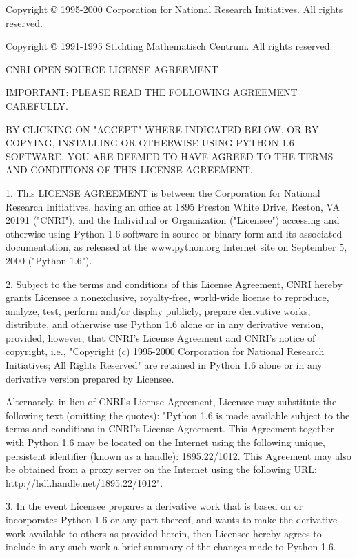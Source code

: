 Copyright \copyright{} 1995-2000 Corporation for National Research
Initiatives.  All rights reserved.

Copyright \copyright{} 1991-1995 Stichting Mathematisch Centrum.  All
rights reserved.

CNRI OPEN SOURCE LICENSE AGREEMENT


IMPORTANT: PLEASE READ THE FOLLOWING AGREEMENT CAREFULLY.

BY CLICKING ON "ACCEPT" WHERE INDICATED BELOW, OR BY COPYING,
INSTALLING OR OTHERWISE USING PYTHON 1.6 SOFTWARE, YOU ARE DEEMED TO
HAVE AGREED TO THE TERMS AND CONDITIONS OF THIS LICENSE AGREEMENT.

1. This LICENSE AGREEMENT is between the Corporation for National
Research Initiatives, having an office at 1895 Preston White Drive,
Reston, VA 20191 ("CNRI"), and the Individual or Organization
("Licensee") accessing and otherwise using Python 1.6 software in
source or binary form and its associated documentation, as released at
the www.python.org Internet site on September 5, 2000 ("Python 1.6").

2. Subject to the terms and conditions of this License Agreement, CNRI
hereby grants Licensee a nonexclusive, royalty-free, world-wide
license to reproduce, analyze, test, perform and/or display publicly,
prepare derivative works, distribute, and otherwise use Python 1.6
alone or in any derivative version, provided, however, that CNRI's
License Agreement and CNRI's notice of copyright, i.e., "Copyright (c)
1995-2000 Corporation for National Research Initiatives; All Rights
Reserved" are retained in Python 1.6 alone or in any derivative
version prepared by Licensee.

Alternately, in lieu of CNRI's License Agreement, Licensee may
substitute the following text (omitting the quotes): "Python 1.6 is
made available subject to the terms and conditions in CNRI's License
Agreement.  This Agreement together with Python 1.6 may be located on
the Internet using the following unique, persistent identifier (known
as a handle): 1895.22/1012.  This Agreement may also be obtained from a
proxy server on the Internet using the following URL:
http://hdl.handle.net/1895.22/1012".

3. In the event Licensee prepares a derivative work that is based on
or incorporates Python 1.6 or any part thereof, and wants to make the
derivative work available to others as provided herein, then Licensee
hereby agrees to include in any such work a brief summary of the
changes made to Python 1.6.

